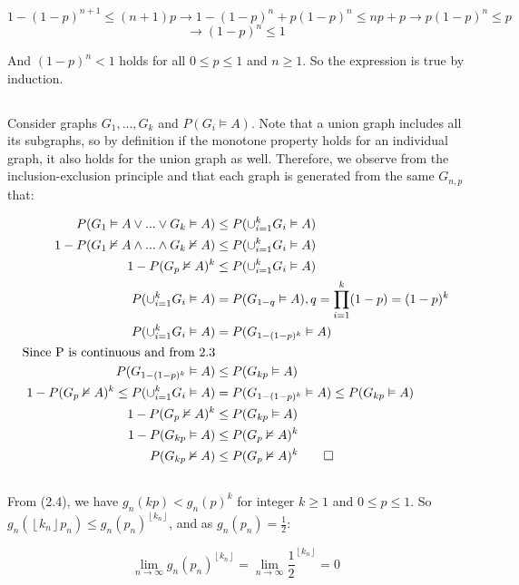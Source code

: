 \documentclass{article}
\begin{document}
$$1-(1-p)^{n+1} \le (n+1)p \rightarrow 1 - (1-p)^n + p(1-p)^n \le np + p \rightarrow p(1-p)^n \le p $$ 
$$\rightarrow (1-p)^n \le 1$$

And $(1-p)^n < 1$ holds for all $0 \le p \le 1$ and $n \ge 1$. So the expression is true by induction.

\subsection{}
Consider graphs $G_1,...,G_k$ and $P(G_i\vDash A)$. Note that a union graph includes all its subgraphs, so by definition if the monotone property holds for an individual graph, it also holds for the union graph as well. Therefore, we observe from the inclusion-exclusion principle and that each graph is generated from the same $G_{n,p}$ that:

\begin{align*}
P(G_1\vDash A \vee ... \vee G_k\vDash A)&\le P(\cup_{i=1}^k G_i\vDash A)\\
1-P(G_1\nvDash A \wedge ... \wedge G_k\nvDash A)&\le P(\cup_{i=1}^k G_i\vDash A)\\
1-P(G_p\nvDash A)^k&\le P(\cup_{i=1}^k G_i\vDash A)\\
P(\cup_{i=1}^kG_i\vDash A)&=P(G_{1-q}\vDash A), q=\prod_{i=1}^k(1-p)=(1-p)^k\\
P(\cup_{i=1}^kG_i\vDash A)&=P(G_{1-(1-p)^k}\vDash A)\\
\text{Since P is continuous and from 2.3}\\
P(G_{1-(1-p)^k}\vDash A)&\le P(G_{kp}\vDash A)\\
1-P(G_p\nvDash A)^k\le P(\cup_{i=1}^k G_i\vDash A)&=P(G_{1-(1-p)^k}\vDash A)\le P(G_{kp}\vDash A)\\
1-P(G_p\nvDash A)^k&\le P(G_{kp}\vDash A)\\
1-P(G_{kp}\vDash A)&\le P(G_p\nvDash A)^k\\
P(G_{kp}\nvDash A)&\le P(G_p\nvDash A)^k\qed \\
\end{align*}

\subsection{}
From (2.4), we have $g_n(kp) < g_n(p)^k$ for integer $k \ge 1$ and $0 \le p \le 1$. So $g_n(\left \lfloor{k_n}\right \rfloor p_n) \le g_n(p_n)^{\left \lfloor{k_n}\right \rfloor}$, and as $g_n(p_n) = \frac{1}{2}$: 

$$\lim_{n\to\infty} g_n(p_n)^{\left \lfloor{k_n}\right \rfloor} = \lim_{n\to\infty} \frac{1}{2}^{\left \lfloor{k_n}\right \rfloor} = 0$$
\end{document}
